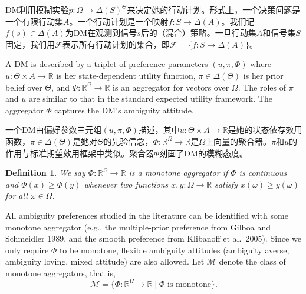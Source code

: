 \documentclass[12pt,a4paper]{article}
\newenvironment{original}
  {\par\vspace{4pt}\noindent\color{black}\ignorespaces}
  {\par\vspace{2pt}}
\newenvironment{translation}
  {\par\vspace{2pt}\noindent\color{myblue}\ignorespaces}
  {\par\vspace{6pt}}
\newtheorem{definition}[theorem]{Definition}
\newcommand{\R}{\mathbb{R}}
\newcommand{\Delt}{\Delta}
\newcommand{\calF}{\mathcal{F}}
\newcommand{\calM}{\mathcal{M}}
\begin{document}
\begin{translation}
DM利用模糊实验$p:\Omega\to\Delt(S)^{\Theta}$来决定她的行动计划。形式上，一个决策问题是一个有限行动集$A$。一个行动计划是一个映射$f:S\to\Delt(A)$。我们记$f(s)\in\Delt(A)$为DM在观测到信号$s$后的（混合）策略。一旦行动集$A$和信号集$S$固定，我们用$\calF$表示所有行动计划的集合，即$\calF=\{f:S\to\Delt(A)\}$。
\end{translation}

\begin{original}
A DM is described by a triplet of preference parameters $(u,\pi,\Phi)$ where $u:\Theta\times A\to\R$ is her state-dependent utility function, $\pi\in\Delt(\Theta)$ is her prior belief over $\Theta$, and $\Phi:\R^{\Omega}\to\R$ is an aggregator for vectors over $\Omega$. The roles of $\pi$ and $u$ are similar to that in the standard expected utility framework. The aggregator $\Phi$ captures the DM's ambiguity attitude.
\end{original}

\begin{translation}
一个DM由偏好参数三元组$(u,\pi,\Phi)$描述，其中$u:\Theta\times A\to\R$是她的状态依存效用函数，$\pi\in\Delt(\Theta)$是她对$\Theta$的先验信念，$\Phi:\R^{\Omega}\to\R$是$\Omega$上向量的聚合器。$\pi$和$u$的作用与标准期望效用框架中类似。聚合器$\Phi$刻画了DM的模糊态度。
\end{translation}

\begin{definition}
We say $\Phi:\R^{\Omega}\to\R$ is a monotone aggregator if $\Phi$ is continuous and $\Phi(x)\geq\Phi(y)$ whenever two functions $x,y:\Omega\to\R$ satisfy $x(\omega)\geq y(\omega)$ for all $\omega\in\Omega$.
\end{definition}

\begin{original}
All ambiguity preferences studied in the literature can be identified with some monotone aggregator (e.g., the multiple-prior preference from Gilboa and Schmeidler 1989, and the smooth preference from Klibanoff et al.\ 2005). Since we only require $\Phi$ to be monotone, flexible ambiguity attitudes (ambiguity averse, ambiguity loving, mixed attitude) are also allowed. Let $\calM$ denote the class of monotone aggregators, that is,
\begin{equation}
    \calM = \{\Phi:\R^{\Omega}\to\R \mid \Phi \text{ is monotone}\}. \label{eq:calM}
\end{equation}
\end{original}
\end{document}
